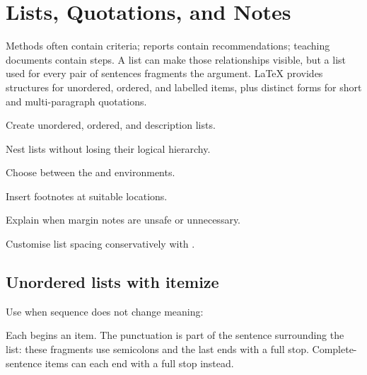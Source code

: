 \chapter{Lists, Quotations, and Notes}
\label{chap:lists}

Methods often contain criteria; reports contain recommendations; teaching
documents contain steps. A list can make those relationships visible, but a
list used for every pair of sentences fragments the argument. \LaTeX{} provides
structures for unordered, ordered, and labelled items, plus distinct forms for
short and multi-paragraph quotations.

\begin{learningoutcomes}
  \item Create unordered, ordered, and description lists.
  \item Nest lists without losing their logical hierarchy.
  \item Choose between the  and  environments.
  \item Insert footnotes at suitable locations.
  \item Explain when margin notes are unsafe or unnecessary.
  \item Customise list spacing conservatively with .
\end{learningoutcomes}

\section{Unordered lists with itemize}

Use  when sequence does not change meaning:


Each  begins an item. The punctuation is part of the sentence
surrounding the list: these fragments use semicolons and the last ends with a
full stop. Complete-sentence items can each end with a full stop instead.

